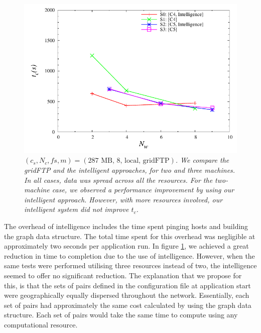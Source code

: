 \documentclass{rspublic}
\newcommand{\micnote}[1]{ {\textcolor{blue} { ***Michael: #1 }}}
\newcommand{\betynote}[1]{ {\textcolor{orange} { ***Bety: #1 }}}
\newcommand{\jhanote}[1]{} \newcommand{\micnote}[1]{}\newcommand{\betynote}[1]{} \newcommand{\fixme}[1]{}
\begin{document}
\begin{figure}[!ht]
\begin{center}
   \includegraphics[scale=0.5] {data/graphs/IntelligentFigure}
\end{center}
\caption{\textit{$(c_s, N_c, fs, m)=(\mbox{287 MB, 8, local, gridFTP})$.
We compare the gridFTP and the intelligent approaches, for two and three
machines. In all cases, data was spread across all the resources.  For
the two-machine case, we observed a performance improvement by using our
intelligent approach. However, with more resources involved, our
intelligent system did not improve $t_c$.}}
\label{Fig:IntelligentExp}
\end{figure}


The overhead of intelligence includes the time spent pinging hosts and
building the graph data structure. The total time spent for this
overhead was negligible at approximately two seconds per application
run. In figure \ref{Fig:IntelligentExp}, we achieved a great reduction
in time to completion due to the use of intelligence.  However, when the
same tests were performed utilising three resources instead of two, the
intelligence seemed to offer no significant reduction. The explanation
that we propose for this, is that the sets of pairs defined in the
configuration file at application start were geographically equally
dispersed throughout the network.  Essentially, each set of pairs had
approximately the same cost calculated by using the graph data
structure. Each set of pairs would take the same time to compute using
any computational resource.  \jhanote{Perhaps define a test to verify
this, so a note can go in saying we investigated this}
\end{document}
